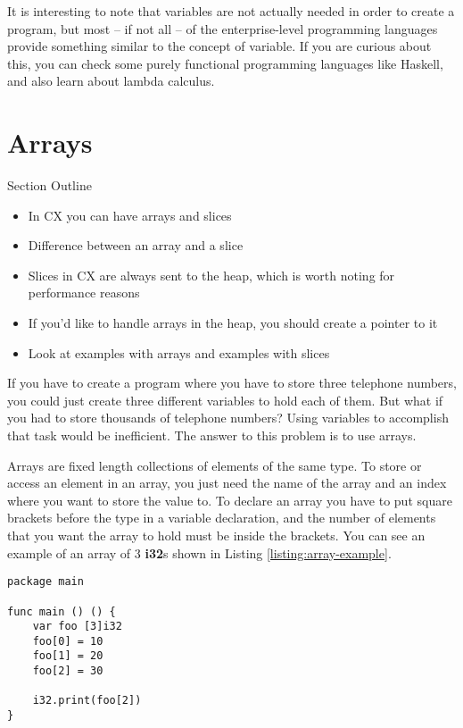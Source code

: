 \documentclass[11pt,fleqn,openany]{book} %
\begin{document}
It is interesting to note that variables are not actually needed in order to create a program, but most -- if not all -- of the enterprise-level programming languages provide something similar to the concept of variable. If you are curious about this, you can check some purely functional programming languages like Haskell, and also learn about lambda calculus.

\section{Arrays}

\begin{remark}
Section Outline
    \begin{itemize}
    	\item In CX you can have arrays and slices
        \item Difference between an array and a slice
        \item Slices in CX are always sent to the heap, which is worth noting for performance reasons
        \item If you'd like to handle arrays in the heap, you should create a pointer to it
        \item Look at examples with arrays and examples with slices
    \end{itemize}
\end{remark}

If you have to create a program where you have to store three telephone numbers, you could just create three different variables to hold each of them. But what if you had to store thousands of telephone numbers? Using variables to accomplish that task would be inefficient. The answer to this problem is to use arrays.

Arrays are fixed length collections of elements of the same type. To store or access an element in an array, you just need the name of the array and an index where you want to store the value to. To declare an array you have to put square brackets before the type in a variable declaration, and the number of elements that you want the array to hold must be inside the brackets. You can see an example of an array of 3 \textbf{i32}s shown in Listing \ref{listing:array-example}.

\begin{lstlisting}[caption={Array Example},captionpos=b,label={listing:array-example}]
package main

func main () () {
	var foo [3]i32
	foo[0] = 10
	foo[1] = 20
	foo[2] = 30

	i32.print(foo[2])
}
\end{lstlisting}
\end{document}
